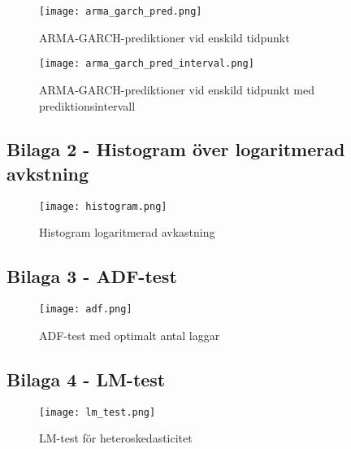 \documentclass[12pt]{article}
\begin{document}
\begin{figure}[H]
\caption{ARMA-GARCH-prediktioner vid enskild tidpunkt}
\texttt{[image: arma\_garch\_pred.png]}
\centering
\end{figure}

\begin{figure}[H]
\caption{ARMA-GARCH-prediktioner vid enskild tidpunkt med prediktionsintervall}
\texttt{[image: arma\_garch\_pred\_interval.png]}
\centering
\end{figure}

\newpage
\subsection{Bilaga 2 - Histogram över logaritmerad avkstning}
\begin{figure}[H]
\caption{Histogram logaritmerad avkastning}
\texttt{[image: histogram.png]}
\centering
\end{figure}

\newpage
\subsection{Bilaga 3 - ADF-test}
\begin{figure}[H]
\caption{ADF-test med optimalt antal laggar}
\texttt{[image: adf.png]}
\centering
\end{figure}

\newpage
\subsection{Bilaga 4 - LM-test}
\begin{figure}[H]
\caption{LM-test för heteroskedasticitet}
\texttt{[image: lm\_test.png]}
\centering
\end{figure}

\newpage
\end{document}
